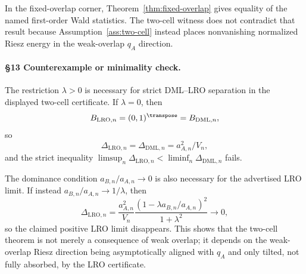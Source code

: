 In the fixed-overlap corner, Theorem~\ref{thm:fixed-overlap} gives equality of the named first-order Wald statistics.  The two-cell witness does not contradict that result because Assumption~\ref{ass:two-cell} instead places nonvanishing normalized Riesz energy in the weak-overlap \(q_A\) direction.

\paragraph{\S13 Counterexample or minimality check.}
The restriction \(\lambda>0\) is necessary for strict DML--LRO separation in the displayed two-cell certificate.  If \(\lambda=0\), then
\[
  B_{\mathrm{LRO},n}=(0,1)^\transpose=B_{\mathrm{DML},n},
\]
so
\[
  \Delta_{\mathrm{LRO},n}=\Delta_{\mathrm{DML},n}=a_{A,n}^2/V_n,
\]
and the strict inequality \(\limsup_n\Delta_{\mathrm{LRO},n}<\liminf_n\Delta_{\mathrm{DML},n}\) fails.

The dominance condition \(a_{B,n}/a_{A,n}\to0\) is also necessary for the advertised LRO limit.  If instead \(a_{B,n}/a_{A,n}\to1/\lambda\), then
\[
  \Delta_{\mathrm{LRO},n}
  =
  \frac{a_{A,n}^2}{V_n}
  \frac{(1-\lambda a_{B,n}/a_{A,n})^2}{1+\lambda^2}
  \to0,
\]
so the claimed positive LRO limit disappears.  This shows that the two-cell theorem is not merely a consequence of weak overlap; it depends on the weak-overlap Riesz direction being asymptotically aligned with \(q_A\) and only tilted, not fully absorbed, by the LRO certificate.
